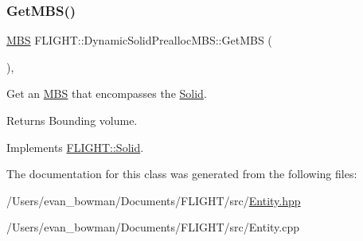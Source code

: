 \subsubsection{\texorpdfstring{Get\+M\+B\+S()}{GetMBS()}}
{\footnotesize\ttfamily \hyperlink{class_f_l_i_g_h_t_1_1_m_b_s}{M\+BS} F\+L\+I\+G\+H\+T\+::\+Dynamic\+Solid\+Prealloc\+M\+B\+S\+::\+Get\+M\+BS (\begin{DoxyParamCaption}{ }\end{DoxyParamCaption})\hspace{0.3cm}{\ttfamily [override]}, {\ttfamily [virtual]}}



Get an \hyperlink{class_f_l_i_g_h_t_1_1_m_b_s}{M\+BS} that encompasses the \hyperlink{class_f_l_i_g_h_t_1_1_solid}{Solid}. 

\begin{DoxyReturn}{Returns}
Bounding volume. 
\end{DoxyReturn}


Implements \hyperlink{class_f_l_i_g_h_t_1_1_solid_ad96c0c336a3d32fcd4dee3c35043c862}{F\+L\+I\+G\+H\+T\+::\+Solid}.



The documentation for this class was generated from the following files\+:\begin{DoxyCompactItemize}
\item 
/\+Users/evan\+\_\+bowman/\+Documents/\+F\+L\+I\+G\+H\+T/src/\hyperlink{_entity_8hpp}{Entity.\+hpp}\item 
/\+Users/evan\+\_\+bowman/\+Documents/\+F\+L\+I\+G\+H\+T/src/Entity.\+cpp\end{DoxyCompactItemize}
